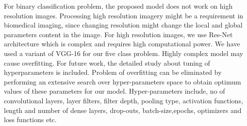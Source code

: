 For binary classification problem, the proposed model does not work on high resolution images.
Processing high resolution imagery might be a requirement in biomedical imaging,
since changing resolution might change the
local and global parameters content in the image. For high resolution images, we use Res-Net architecture which is complex and
requires high computational power. We have used a variant of VGG-16 for
our five class problem. Highly complex model may cause overfitting.
For future work, the detailed study
about tuning of hyperparameters is included.
Problem of overfitting can be eliminated by performing an
extensive search over hyper-parameters space to obtain optimum 
values of these parameters for our model.
Hyper-parameters include, no of convolutional layers, layer filters,
filter depth, pooling type, activation functions, length and number
of dense layers, drop-outs, batch-size,epochs, optimizers and loss
functions etc.
